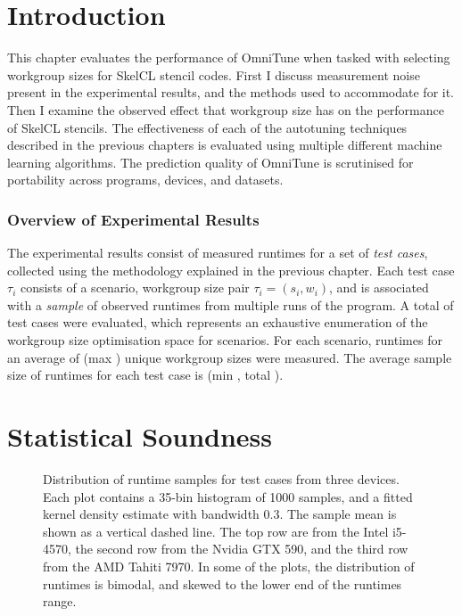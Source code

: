 \section{Introduction}

This chapter evaluates the performance of OmniTune when tasked with
selecting workgroup sizes for SkelCL stencil codes. First I discuss
measurement noise present in the experimental results, and the methods
used to accommodate for it. Then I examine the observed effect that
workgroup size has on the performance of SkelCL stencils. The
effectiveness of each of the autotuning techniques described in the
previous chapters is evaluated using multiple different machine
learning algorithms. The prediction quality of OmniTune is scrutinised
for portability across programs, devices, and datasets.


\subsubsection{Overview of Experimental Results}

The experimental results consist of measured runtimes for a set of
\emph{test cases}, collected using the methodology explained in the
previous chapter. Each test case $\tau_i$ consists of a scenario,
workgroup size pair $\tau_i = (s_i,w_i)$, and is associated with a
\emph{sample} of observed runtimes from multiple runs of the
program. A total of  test cases were
evaluated, which represents an exhaustive enumeration of the workgroup
size optimisation space for  scenarios. For
each scenario, runtimes for an average of 
(max ) unique workgroup sizes were
measured. The average sample size of runtimes for each test case is
 (min , total
).


\section{Statistical Soundness}

\begin{figure}

\caption[Distribution of runtimes]{%
  Distribution of runtime samples for test cases from three
  devices. Each plot contains a 35-bin histogram of 1000 samples, and
  a fitted kernel density estimate with bandwidth 0.3. The sample mean
  is shown as a vertical dashed line. The top row are from the Intel
  i5-4570, the second row from the Nvidia GTX 590, and the third row
  from the AMD Tahiti 7970. In some of the plots, the distribution of
  runtimes is bimodal, and skewed to the lower end of the runtimes
  range.%
}
\label{fig:runtime-histograms}
\end{figure}

